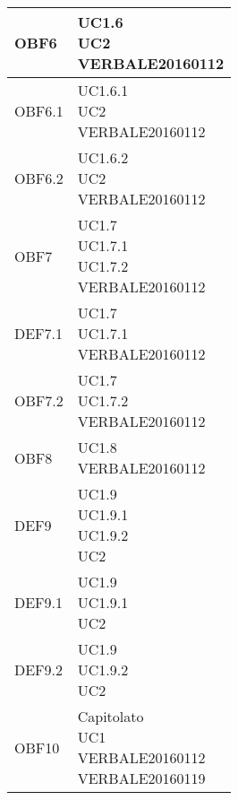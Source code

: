 \documentclass{scalatekids-article}
\begin{document}
\begin{longtable}[H]{|p{5.5cm}|p{5.5cm}|}
  \hline
  OBF6 & \multiLineCell[t]{UC1.6\\UC2\\VERBALE20160112\\}\\
  \hline
  OBF6.1 & \multiLineCell[t]{UC1.6.1\\UC2\\VERBALE20160112\\}\\
  \hline
  OBF6.2 & \multiLineCell[t]{UC1.6.2\\UC2\\VERBALE20160112\\}\\
  \hline
  OBF7 & \multiLineCell[t]{UC1.7\\UC1.7.1\\UC1.7.2\\VERBALE20160112\\}\\
  \hline
  DEF7.1 & \multiLineCell[t]{UC1.7\\UC1.7.1\\VERBALE20160112\\}\\
  \hline
  OBF7.2 & \multiLineCell[t]{UC1.7\\UC1.7.2\\VERBALE20160112\\}\\
  \hline
  OBF8 & \multiLineCell[t]{UC1.8\\VERBALE20160112\\}\\
  \hline
  DEF9 & \multiLineCell[t]{UC1.9\\UC1.9.1\\UC1.9.2\\UC2\\}\\
  \hline
  DEF9.1 & \multiLineCell[t]{UC1.9\\UC1.9.1\\UC2\\}\\
  \hline
  DEF9.2 & \multiLineCell[t]{UC1.9\\UC1.9.2\\UC2\\}\\
  \hline
  OBF10 & \multiLineCell[t]{Capitolato\\UC1\\VERBALE20160112\\VERBALE20160119\\}\\

\end{longtable}
\end{document}

